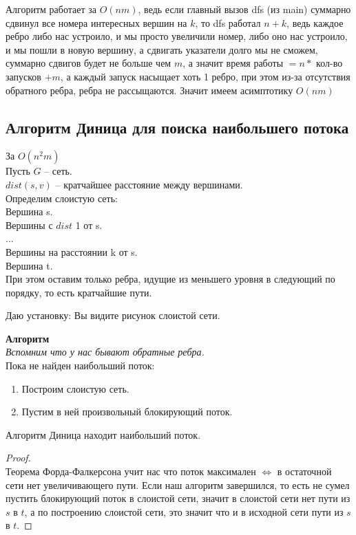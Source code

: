 Алгоритм работает за $O(nm)$, ведь если главный вызов dfs (из main) суммарно сдвинул все номера интересных вершин на $k$, то dfs работал  $n + k$, ведь каждое ребро либо нас устроило, и мы просто увеличили номер, либо оно нас устроило, и мы пошли в новую вершину, а сдвигать указатели долго мы не сможем, суммарно сдвигов будет не больше чем  $m$, а значит время работы $ =  n * $ кол-во запусков $+ m$, а каждый запуск насыщает хоть 1 ребро, при этом из-за отсутствия обратного ребра, ребра не рассыщаются. Значит имеем асимптотику  $O(nm)$

\subsection{Алгоритм Диница для поиска наибольшего потока }

За $O(n^2 m)$ \\

Пусть $G$ -- сеть. \\
$dist(s, v)$ -- кратчайшее расстояние между вершинами. \\

Определим слоистую сеть: \\
Вершина s. \\
Вершины с $dist$ 1 от s. \\
	... \\
Вершины на расстоянии k от s. \\
Вершина t. \\

При этом оставим только ребра, идущие из меньшего уровня в следующий по порядку, то есть кратчайшие пути.

Даю установку: Вы видите рисунок слоистой сети.

\textbf{Алгоритм} \\
\textit{Вспомним что у нас бывают обратные ребра.}\\
Пока не найден наибольший поток:
\begin{enumerate}
	\item Построим слоистую сеть.
	\item Пустим в ней произвольный блокирующий поток.
\end{enumerate}

\begin{prop}
	Алгоритм Диница находит наибольший поток.	
\end{prop}

\begin{proof} \ \\
	Теорема Форда-Фалкерсона учит нас что поток максимален $\iff$ в остаточной сети нет увеличивающего пути. Если наш алгоритм завершился, то есть не сумел пустить блокирующий поток в слоистой сети, значит в слоистой сети нет пути из $s$ в  $t$, а по построению слоистой сети, это значит что и в исходной сети пути из $s$ в  $t$.
\end{proof}

